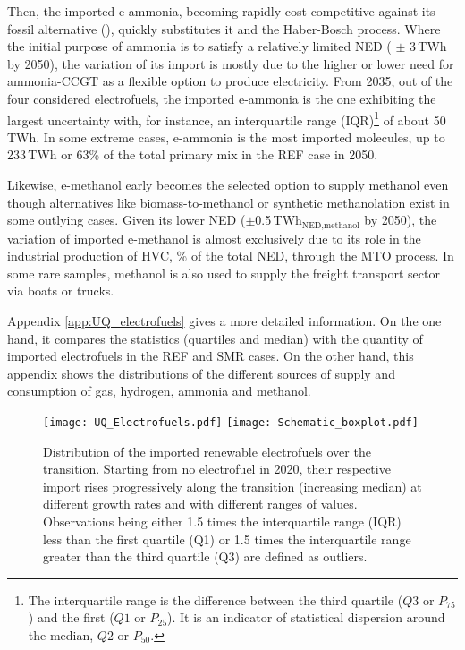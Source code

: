 Then, the imported e-ammonia, becoming rapidly cost-competitive against its fossil alternative (), quickly substitutes it and the Haber-Bosch process. Where the initial purpose of ammonia is to satisfy a relatively limited \acrfull{NED} ( $\pm$ 3\,TWh by 2050), the variation of its import is mostly due to the higher or lower need for ammonia-\gls{CCGT} as a flexible option to produce electricity. From 2035, out of the four considered electrofuels, the imported e-ammonia is the one exhibiting the largest uncertainty with, for instance, an interquartile range (IQR)\footnote{The interquartile range is the difference between the third quartile ($Q3$ or $P_{75}$) and the first ($Q1$ or $P_{25}$). It is an indicator of statistical dispersion around the median, $Q2$ or $P_{50}$.} of about 50\,TWh. In some extreme cases, e-ammonia is the most imported molecules, \ie up to 233\,TWh or 63\% of the total primary mix in the REF case in 2050. 

Likewise, e-methanol early becomes the selected option to supply methanol even though alternatives like biomass-to-methanol or synthetic methanolation exist in some outlying cases. Given its lower \gls{NED} ($\pm$0.5\,TWh$_{\text{NED,methanol}}$ by 2050), the variation of imported e-methanol is almost exclusively due to its role in the industrial production of \gls{HVC}, \% of the total \gls{NED}, through the \acrfull{MTO} process. In some rare samples, methanol is also used to supply the freight transport sector via boats or trucks.

Appendix \ref{app:UQ_electrofuels} gives a more detailed information. On the one hand, it compares the statistics (\ie quartiles and median) with the quantity of imported electrofuels in the REF and SMR cases. On the other hand, this appendix shows the distributions of the different sources of supply and consumption of gas, hydrogen, ammonia and methanol.

\begin{figure}[htbp!]
\centering
\texttt{[image: UQ\_Electrofuels.pdf]}
\texttt{[image: Schematic\_boxplot.pdf]}
\caption{Distribution of the imported renewable electrofuels over the transition. Starting from no electrofuel in 2020, their respective import rises progressively along the transition (\ie increasing median) at different growth rates and with different ranges of values. Observations being either 1.5 times the interquartile range (IQR) less than the first quartile (Q1) or 1.5 times the interquartile range greater than the third quartile (Q3) are defined as outliers.}
\label{fig:results_uq_electrofuels}
\end{figure}

